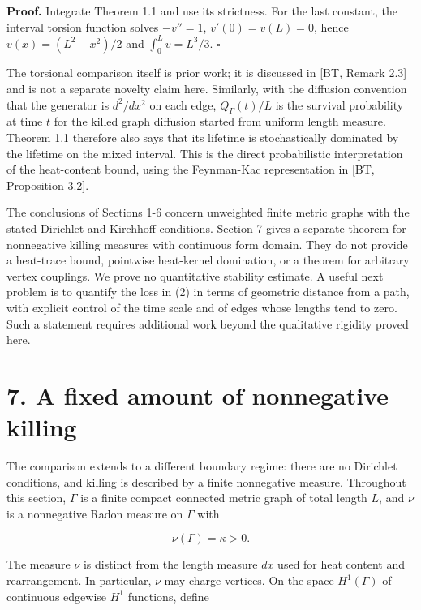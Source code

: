 \documentclass[11pt]{article}
\begin{document}
\textbf{Proof.} Integrate Theorem 1.1 and use its strictness. For the
last constant, the interval torsion function solves \(-v''=1\),
\(v'(0)=v(L)=0\), hence \(v(x)=(L^2-x^2)/2\) and \(\int_0^L v=L^3/3\).
\(\square\)

The torsional comparison itself is prior work; it is discussed in {[}BT,
Remark 2.3{]} and is not a separate novelty claim here. Similarly, with
the diffusion convention that the generator is \(d^2/dx^2\) on each
edge, \(Q_\Gamma(t)/L\) is the survival probability at time \(t\) for
the killed graph diffusion started from uniform length measure. Theorem
1.1 therefore also says that its lifetime is stochastically dominated by
the lifetime on the mixed interval. This is the direct probabilistic
interpretation of the heat-content bound, using the Feynman-Kac
representation in {[}BT, Proposition 3.2{]}.

The conclusions of Sections 1-6 concern unweighted finite metric graphs
with the stated Dirichlet and Kirchhoff conditions. Section 7 gives a
separate theorem for nonnegative killing measures with continuous form
domain. They do not provide a heat-trace bound, pointwise heat-kernel
domination, or a theorem for arbitrary vertex couplings. We prove no
quantitative stability estimate. A useful next problem is to quantify
the loss in (2) in terms of geometric distance from a path, with
explicit control of the time scale and of edges whose lengths tend to
zero. Such a statement requires additional work beyond the qualitative
rigidity proved here.

\section{7. A fixed amount of nonnegative
killing}\label{a-fixed-amount-of-nonnegative-killing}

The comparison extends to a different boundary regime: there are no
Dirichlet conditions, and killing is described by a finite nonnegative
measure. Throughout this section, \(\Gamma\) is a finite compact
connected metric graph of total length \(L\), and \(\nu\) is a
nonnegative Radon measure on \(\Gamma\) with

\[
\nu(\Gamma)=\kappa>0.
\tag{44}
\]

The measure \(\nu\) is distinct from the length measure \(dx\) used for
heat content and rearrangement. In particular, \(\nu\) may charge
vertices. On the space \(H^1(\Gamma)\) of continuous edgewise \(H^1\)
functions, define
\end{document}
